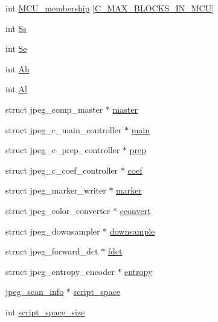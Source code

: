 \begin{DoxyCompactItemize}
int \hyperlink{structjpeg__compress__struct_a6debf977451892aae1116b47c5c1c95f}{M\+C\+U\+\_\+membership} \mbox{[}\hyperlink{jpeglib_8h_a4f270f4efb3fc0bb09f0d5ffa51ca327}{C\+\_\+\+M\+A\+X\+\_\+\+B\+L\+O\+C\+K\+S\+\_\+\+I\+N\+\_\+\+M\+CU}\mbox{]}
\item 
int \hyperlink{structjpeg__compress__struct_adda4b7ef0dda94b38b6e34df42769d81}{Ss}
\item 
int \hyperlink{structjpeg__compress__struct_af2c1fe7c62791cda75219c10d71132d9}{Se}
\item 
int \hyperlink{structjpeg__compress__struct_a301a95efc904d22aca78592f7a21673a}{Ah}
\item 
int \hyperlink{structjpeg__compress__struct_a4160152697f6042b8fe1d6838a8118e2}{Al}
\item 
struct jpeg\+\_\+comp\+\_\+master $\ast$ \hyperlink{structjpeg__compress__struct_a50b9c60f47c9fff393d7d5b3a7b3618e}{master}
\item 
struct jpeg\+\_\+c\+\_\+main\+\_\+controller $\ast$ \hyperlink{structjpeg__compress__struct_ab1bb86e9c2ade498b09a9a19d60e6570}{main}
\item 
struct jpeg\+\_\+c\+\_\+prep\+\_\+controller $\ast$ \hyperlink{structjpeg__compress__struct_a66875fd858cd11fb7a696a717c5c7b76}{prep}
\item 
struct jpeg\+\_\+c\+\_\+coef\+\_\+controller $\ast$ \hyperlink{structjpeg__compress__struct_ad54865b66c30ce332c6757d56393dedc}{coef}
\item 
struct jpeg\+\_\+marker\+\_\+writer $\ast$ \hyperlink{structjpeg__compress__struct_a909e4ca5c3c48f380a53cc1b068eea12}{marker}
\item 
struct jpeg\+\_\+color\+\_\+converter $\ast$ \hyperlink{structjpeg__compress__struct_a7c51e665f18d6e5a0fed053c470f4914}{cconvert}
\item 
struct jpeg\+\_\+downsampler $\ast$ \hyperlink{structjpeg__compress__struct_a65a72b804640a0c339863f6562098113}{downsample}
\item 
struct jpeg\+\_\+forward\+\_\+dct $\ast$ \hyperlink{structjpeg__compress__struct_ac113c777486860f0b2f3784345073a83}{fdct}
\item 
struct jpeg\+\_\+entropy\+\_\+encoder $\ast$ \hyperlink{structjpeg__compress__struct_a30477f9e5f6be16823e1aff2762ae270}{entropy}
\item 
\hyperlink{structjpeg__scan__info}{jpeg\+\_\+scan\+\_\+info} $\ast$ \hyperlink{structjpeg__compress__struct_ab4a2c220ed2cda1b0d4c88518d02a229}{script\+\_\+space}
\item 
int \hyperlink{structjpeg__compress__struct_ae50a683b4baddef6571900ca6240b1a3}{script\+\_\+space\+\_\+size}
\end{DoxyCompactItemize}


